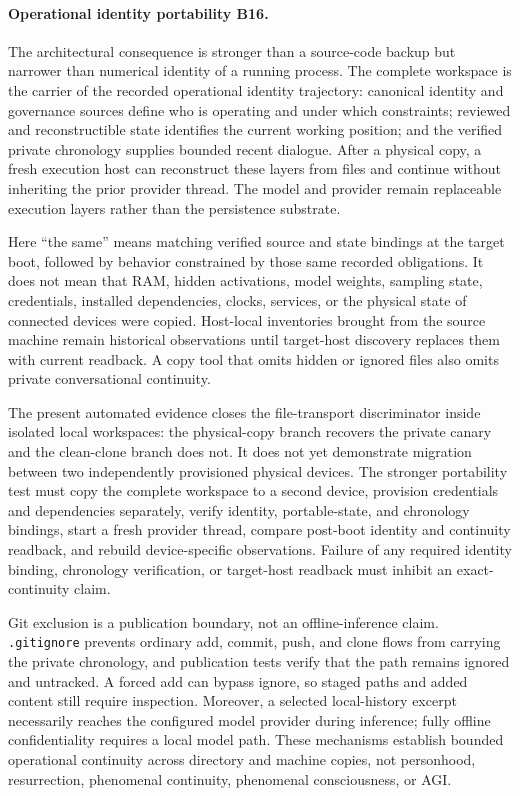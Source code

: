\documentclass[10pt,twocolumn]{article}
\theoremstyle{definition}
\theoremstyle{plain}
\theoremstyle{remark}
\newcommand{\file}[1]{\nolinkurl{#1}}
\newcommand{\identityportabilityrevision}{\textsf{B16}}
\begin{document}
\paragraph{Operational identity portability \identityportabilityrevision.}
The architectural consequence is stronger than a source-code backup but narrower than numerical identity of a running process.  The complete workspace is the carrier of the recorded operational identity trajectory: canonical identity and governance sources define who is operating and under which constraints; reviewed and reconstructible state identifies the current working position; and the verified private chronology supplies bounded recent dialogue.  After a physical copy, a fresh execution host can reconstruct these layers from files and continue without inheriting the prior provider thread.  The model and provider remain replaceable execution layers rather than the persistence substrate.

Here ``the same'' means matching verified source and state bindings at the target boot, followed by behavior constrained by those same recorded obligations.  It does not mean that RAM, hidden activations, model weights, sampling state, credentials, installed dependencies, clocks, services, or the physical state of connected devices were copied.  Host-local inventories brought from the source machine remain historical observations until target-host discovery replaces them with current readback.  A copy tool that omits hidden or ignored files also omits private conversational continuity.

The present automated evidence closes the file-transport discriminator inside isolated local workspaces: the physical-copy branch recovers the private canary and the clean-clone branch does not.  It does not yet demonstrate migration between two independently provisioned physical devices.  The stronger portability test must copy the complete workspace to a second device, provision credentials and dependencies separately, verify identity, portable-state, and chronology bindings, start a fresh provider thread, compare post-boot identity and continuity readback, and rebuild device-specific observations.  Failure of any required identity binding, chronology verification, or target-host readback must inhibit an exact-continuity claim.

Git exclusion is a publication boundary, not an offline-inference claim.  \file{.gitignore} prevents ordinary add, commit, push, and clone flows from carrying the private chronology, and publication tests verify that the path remains ignored and untracked.  A forced add can bypass ignore, so staged paths and added content still require inspection.  Moreover, a selected local-history excerpt necessarily reaches the configured model provider during inference; fully offline confidentiality requires a local model path.  These mechanisms establish bounded operational continuity across directory and machine copies, not personhood, resurrection, phenomenal continuity, phenomenal consciousness, or AGI.
\end{document}
